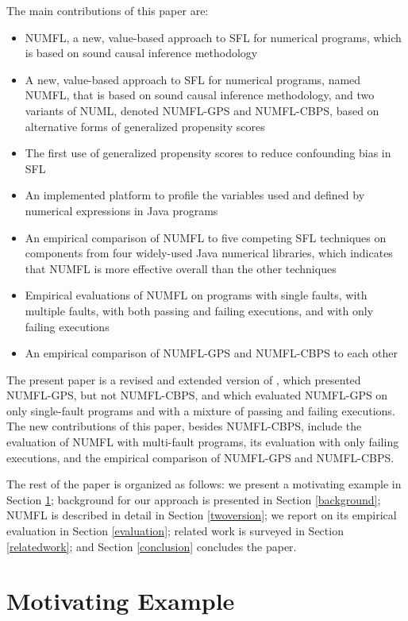 The main contributions of this paper are:
\vspace{-0.2cm}
\begin{itemize}
\item NUMFL, a new, value-based approach to SFL for numerical programs, which is based on sound causal inference methodology
	\item A new, value-based approach to SFL for numerical programs, named NUMFL, that is based on sound causal inference methodology, and two variants of NUML, denoted NUMFL-GPS and NUMFL-CBPS, based on alternative forms of generalized propensity scores
	\item The first use of generalized propensity scores to reduce confounding bias in SFL
	\item An implemented platform to profile the variables used and defined by numerical expressions in Java programs
\item An empirical comparison of NUMFL to five competing SFL techniques on components from four widely-used Java numerical libraries, which indicates that NUMFL is more effective overall than the other techniques
    \item Empirical evaluations of NUMFL on programs with single faults, with multiple faults, with both passing and failing executions, and with only failing executions
\item	An empirical comparison of NUMFL-GPS and NUMFL-CBPS to each other
\end{itemize}

The present paper is a revised and extended version of \cite{Bai2015}, which presented NUMFL-GPS, but not NUMFL-CBPS, and which evaluated NUMFL-GPS on only single-fault programs and with a mixture of passing and failing executions.  The new contributions of this paper, besides NUMFL-CBPS, include the evaluation of NUMFL with multi-fault programs, its evaluation with only failing executions, and the empirical comparison of NUMFL-GPS and NUMFL-CBPS.

The rest of the paper is organized as follows: we present a motivating example in Section \ref{motivating}; background for our approach is presented in Section \ref{background}; NUMFL is described in detail in Section \ref{twoversion};  we report on its empirical evaluation in Section \ref{evaluation}; related work is surveyed in Section \ref{relatedwork}; and Section \ref{conclusion} concludes the paper.

\section{Motivating Example}\label{motivating}

